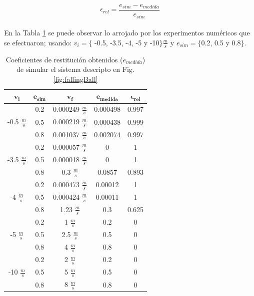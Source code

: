\documentclass{article}
\begin{document}
 \begin{equation}
  \epsilon_{rel} = \frac{e_{sim}-e_{medida}}{e_{sim}}
\end{equation}
\\
En la Tabla \ref{table1} se puede observar lo arrojado por los experimentos num\'ericos que se efectuaron; usando: $v_{i}= \{$ -0.5, -3.5, -4, -5 y -10$\} \frac{m}{s}$ y $e_{sim}= \{ $0.2, 0.5 y 0.8$\} $.
\begin{table}[H]%
  \centering
  	\begin{tabular}{ | c | c || c | c | c | }
	  		\hline
	  		$\boldsymbol{v_{i}}$ & $\boldsymbol{e_{sim}}$ & $\boldsymbol{v_{f}}$ & $\boldsymbol{e_{medida}}$ & $\boldsymbol{\epsilon_{rel}}$ \\
			\hline 
			\multirow{3}{*}{-0.5 $\frac{m}{s}$} & 0.2 & 0.000249 $\frac{m}{s}$& 0.000498 & 0.997\\ \cline{2-5}
								& 0.5 & 0.000219 $\frac{m}{s}$ & 0.000438 & 0.999\\ \cline{2-5}
	  							& 0.8 & 0.001037 $\frac{m}{s}$ & 0.002074 & 0.997 \\ \cline{2-5}
	  		\hline 
			\hline
			\multirow{3}{*}{-3.5 $\frac{m}{s}$} & 0.2 & 0.000057 $\frac{m}{s}$ & 0 & 1\\ \cline{2-5}
	  							& 0.5 & 0.000018 $\frac{m}{s}$ & 0 & 1 \\ \cline{2-5}
								& 0.8 & 0.3 $\frac{m}{s}$ & 0.0857 & 0.893 \\ \cline{2-5}
	  		\hline
			\hline
			\multirow{3}{*}{-4 $\frac{m}{s}$} & 0.2 & 0.000473 $\frac{m}{s}$ & 0.00012 & 1\\ \cline{2-5}
	  							& 0.5 & 0.000424 $\frac{m}{s}$ & 0.00011 & 1 \\ \cline{2-5}
	  							& 0.8 & 1.23 $\frac{m}{s}$ & 0.3 & 0.625 \\ \cline{2-5}
	  		\hline
			\hline
			\multirow{3}{*}{-5 $\frac{m}{s}$} & 0.2 & 1 $\frac{m}{s}$ & 0.2 & 0 \\ \cline{2-5}
	  							& 0.5 & 2.5 $\frac{m}{s}$ & 0.5 & 0 \\ \cline{2-5}
	  							& 0.8 & 4 $\frac{m}{s}$ & 0.8 & 0 \\ \cline{2-5}
			\hline
			\hline
			\multirow{3}{*}{-10 $\frac{m}{s}$} & 0.2 & 2 $\frac{m}{s}$ & 0.2 & 0\\ \cline{2-5}
	  							& 0.5 & 5 $\frac{m}{s}$ & 0.5 & 0 \\ \cline{2-5}
	  							& 0.8 & 8 $\frac{m}{s}$ & 0.8 & 0 \\ \cline{2-5}
			\hline
	\end{tabular}
  \captionsetup{justification=centering}
  \caption{Coeficientes de restituci\'on obtenidos ($e_{medida}$) de simular el sistema descripto en Fig. \ref{fig:fallingBall}}%
  \label{table1}%
\end{table}
\end{document}

